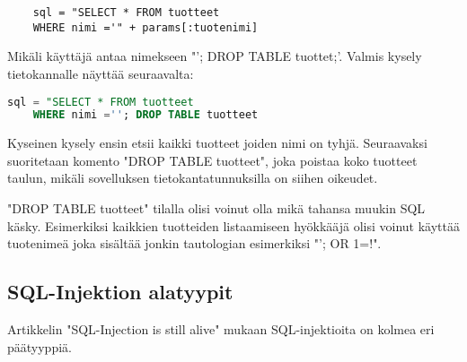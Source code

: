 \documentclass[finnish]{tktltiki2}
\theoremstyle{definition}
\theoremstyle{remark}
\begin{document}
	\begin{lstlisting}
	sql = "SELECT * FROM tuotteet
	WHERE nimi ='" + params[:tuotenimi]
	\end{lstlisting}
	
	Mikäli käyttäjä antaa nimekseen "'; DROP TABLE tuottet;'. Valmis kysely tietokannalle näyttää seuraavalta:
	
	\begin{lstlisting}[language=sql]
	sql = "SELECT * FROM tuotteet
	WHERE nimi =''; DROP TABLE tuotteet                             
	\end{lstlisting}
	
	Kyseinen kysely ensin etsii kaikki tuotteet joiden nimi on tyhjä. Seuraavaksi suoritetaan komento "DROP TABLE tuotteet", joka poistaa koko tuotteet taulun, mikäli sovelluksen tietokantatunnuksilla on siihen oikeudet. 
	
	"DROP TABLE tuotteet" tilalla olisi voinut olla mikä tahansa muukin SQL käsky. Esimerkiksi kaikkien tuotteiden listaamiseen hyökkääjä olisi voinut käyttää tuotenimeä joka sisältää jonkin tautologian esimerkiksi "'; OR 1=!".
	
	\subsection{SQL-Injektion alatyypit}
	Artikkelin "SQL-Injection is still alive"  mukaan SQL-injektioita on kolmea eri päätyyppiä\cite{still-alive}.
	
\end{document}
